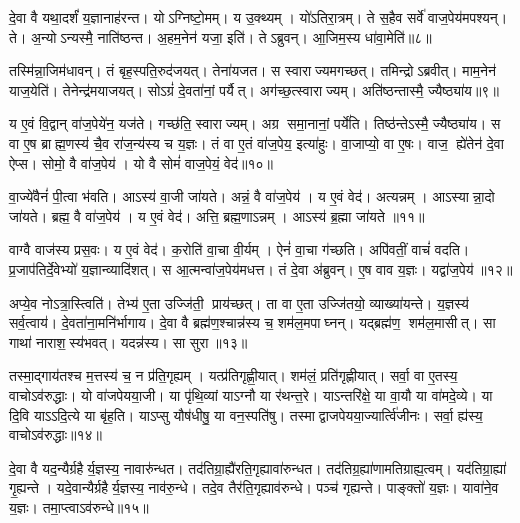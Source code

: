 दे॒वा वै यथा॒दर्\mbox{}शं॑ य॒ज्ञानाह॑रन्त।
योऽग्निष्टो॒मम्।
य उ॒क्थ्यम्।
यो॑ऽतिरा॒त्रम्।
ते स॒हैव सर्वे॑ वाज॒पेय॑मपश्यन्।
ते।
अ॒न्योऽन्यस्मै॒ नाति॑ष्ठन्त।
अ॒हम॒नेन॑ यजा॒ इति॑।
तेऽब्रुवन्।
आ॒जिम॒स्य धा॑वा॒मेति॑॥८॥

तस्मि॑न्ना॒जिम॑धावन्।
तं बृह॒स्पति॒रुद॑जयत्।
तेना॑यजत।
स स्वाराज्यमगच्छत्।
तमिन्द्रोऽब्रवीत्।
माम॒नेन॑ याज॒येति॑।
तेनेन्द्र॑मयाजयत्।
सोऽग्रं॑ दे॒वता॑नां॒ पर्यैत्।
अग॑च्छ॒त्स्वाराज्यम्।
अति॑ष्ठन्तास्मै॒ ज्यैष्ठ्या॑य॥९॥

य ए॒वं वि॒द्वान् वा॑ज॒पेये॑न॒ यज॑ते।
गच्छ॑ति॒ स्वाराज्यम्।
अग्र समा॒नानां॒ पर्ये॑ति।
तिष्ठ॑न्तेऽस्मै॒ ज्यैष्ठ्या॑य।
स वा ए॒ष ब्राह्म॒णस्य॑ चै॒व रा॑ज॒न्य॑स्य च य॒ज्ञः।
तं वा ए॒तं वा॑ज॒पेय॒ इत्या॑हुः।
वा॒जाप्यो॒ वा ए॒षः।
वाज॒ ह्ये॑तेन॑ दे॒वा ऐप्स\sn{}।
सोमो॒ वै वा॑ज॒पेय॑।
यो वै सोमं॑ वाज॒पेयं॒ वेद॑॥१०॥

वा॒ज्ये॑वैनं॑ पी॒त्वा भ॑वति।
आऽस्य॑ वा॒जी जा॑यते।
अन्नं॒ वै वा॑ज॒पेय॑।
य ए॒वं वेद॑।
अत्यन्नम्।
आऽस्यान्ना॒दो जा॑यते।
ब्रह्म॒ वै वा॑ज॒पेय॑।
य ए॒वं वेद॑।
अत्ति॒ ब्रह्म॒णाऽन्नम्।
आऽस्य॑ ब्र॒ह्मा जा॑यते ॥११॥

वाग्वै वाज॑स्य प्रस॒वः।
य ए॒वं वेद॑।
क॒रोति॑ वा॒चा वी॒र्यम्।
ऐनं॑ वा॒चा ग॑च्छति।
अपि॑वतीं॒ वाचं॑ वदति।
प्र॒जाप॑तिर्दे॒वेभ्यो॑ य॒ज्ञान्व्यादि॑शत्।
स आ॒त्मन्वा॑ज॒पेय॑मधत्त।
तं दे॒वा अ॑ब्रुवन्।
ए॒ष वाव य॒ज्ञः।
यद्वा॑ज॒पेय॑॥१२॥

अप्ये॒व नोऽत्रा॒स्त्विति॑।
तेभ्य॑ ए॒ता उज्जि॑ती॒ प्राय॑च्छत्।
ता वा ए॒ता उज्जि॑तयो॒ व्याख्या॑यन्ते।
य॒ज्ञस्य॑ सर्व॒त्वाय॑।
दे॒वता॑ना॒मनि॑र्भागाय।
दे॒वा वै ब्रह्म॑ण॒श्चान्न॑स्य च॒ शम॑ल॒मपाघ्नन्।
यद्ब्रह्म॑ण॒ शम॑ल॒मासीत्।
सा गाथा॑ नाराश॒स्य॑भवत्।
यदन्न॑स्य।
सा सुरा॥१३॥

तस्मा॒द्गाय॑तश्च म॒त्तस्य॑ च॒ न प्र॑ति॒गृह्यम्।
यत्प्र॑तिगृह्णी॒यात्।
शम॑लं॒ प्रति॑गृह्णीयात्।
सर्वा॒ वा ए॒तस्य॒ वाचोऽव॑रुद्धाः।
यो वा॑जपेयया॒जी।
या पृ॑थि॒व्यां याऽग्नौ या र॑थन्त॒रे।
याऽन्तरि॑क्षे॒ या वा॒यौ या वा॑मदे॒व्ये।
या दि॒वि याऽऽदि॒त्ये या बृ॑ह॒ति।
याऽप्सु यौष॑धीषु॒ या वन॒स्पति॑षु।
तस्माद्वाजपेयया॒ज्यार्त्वि॑जीनः।
सर्वा॒ ह्य॑स्य॒ वाचोऽव॑रुद्धाः॥१४॥\anuvakamend[धा॒वा॒मेति॒ ज्यैष्ठ्या॑य॒ वेद॑ ब्र॒ह्मा जा॑यते वाज॒पेय॒ सुराऽऽर्त्वि॑जीन॒ एकं॑ च]

दे॒वा वै यद॒न्यैर्ग्रहैर्य॒ज्ञस्य॒ नावारु॑न्धत।
तद॑तिग्रा॒ह्यै॑रति॒\-गृह्या\-वा॑रुन्धत।
तद॑तिग्र॒ह्या॑णामतिग्राह्य॒त्वम्।
यद॑तिग्रा॒ह्या॑ गृ॒ह्यन्ते।
यदे॒वान्यैर्ग्रहैर्य॒ज्ञस्य॒ नाव॑रु॒न्धे।
तदे॒व तैर॑ति॒गृह्या\-व॑रुन्धे।
पञ्च॑ गृह्यन्ते।
पाङ्क्तो॑ य॒ज्ञः।
यावा॑ने॒व य॒ज्ञः।
तमा॒प्त्वाऽव॑रुन्धे॥१५॥

